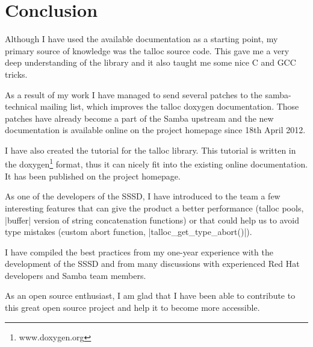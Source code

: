 \chapter{Conclusion}

Although I have used the available documentation as a starting point, my primary
source of knowledge was the talloc source code. This gave me a very deep
understanding of the library and it also taught me some nice C and GCC tricks.

As a result of my work I have managed to send several patches to the
samba-technical mailing list, which improves the talloc doxygen documentation.
Those patches have already become a part of the Samba upstream and the new
documentation is available online on the project homepage since 18th April 2012.

I have also created the tutorial for the talloc library. This tutorial is
written in the doxygen\footnote{www.doxygen.org} format, thus it can nicely
fit into the existing online documentation. It has been published on the project
homepage.

As one of the developers of the SSSD, I have introduced to the team a few
interesting features that can give the product a better performance (talloc
pools, |buffer| version of string concatenation functions) or that could help
us to avoid type mistakes (custom abort function, |talloc_get_type_abort()|).

I have compiled the best practices from my one-year experience with the
development of the SSSD and from many discussions with experienced Red Hat
developers and Samba team members.

As an open source enthusiast, I am glad that I have been able to contribute to
this great open source project and help it to become more accessible.
